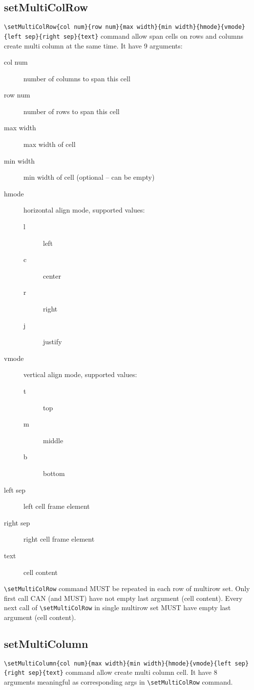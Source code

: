 \documentclass[a4paper]{article}
\begin{document}
\subsection{setMultiColRow}
\Verb$\setMultiColRow{col num}{row num}{max width}{min width}{hmode}{vmode}{left sep}{right sep}{text}$ command allow span cells on rows and columns create multi column at the same time.
It have 9 arguments:
\begin{description}
  \item[col num] number of columns to span this cell
  \item[row num] number of rows to span this cell
  \item[max width] max width of cell
  \item[min width] min width of cell (optional – can be empty)
  \item[hmode] horizontal align mode, supported values:
    \begin{description}
      \item[l] left
      \item[c] center
      \item[r] right
      \item[j] justify
    \end{description}
  \item[vmode] vertical align mode, supported values:
    \begin{description}
      \item[t] top
      \item[m] middle
      \item[b] bottom
    \end{description}
  \item[left sep]  left cell frame element
  \item[right sep] right cell frame element
  \item[text] cell content
\end{description}

\Verb$\setMultiColRow$ command MUST be repeated in each row of multirow set.
Only first call CAN (and MUST) have not empty last argument (cell content).
Every next call of \Verb$\setMultiColRow$ in single multirow set MUST have empty last argument (cell content).

\subsection{setMultiColumn}
\Verb$\setMultiColumn{col num}{max width}{min width}{hmode}{vmode}{left sep}{right sep}{text}$ command allow create multi column cell.
It have 8 arguments meaningful as corresponding args in \Verb$\setMultiColRow$ command.
\end{document}
